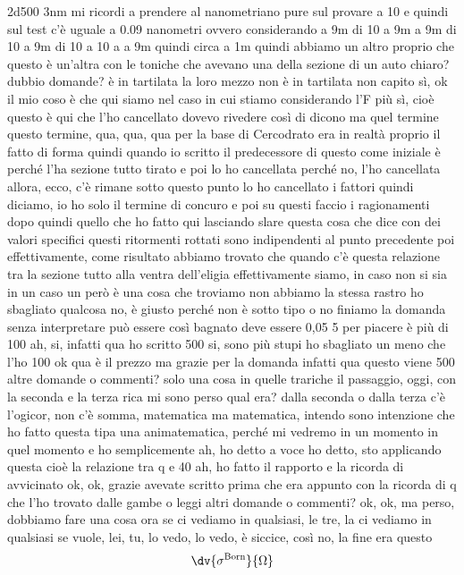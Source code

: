 \begin{soluzione}
   2d500 3nm mi ricordi a prendere al nanometriano pure sul provare a 10 e quindi sul test c'è uguale a 0.09 nanometri ovvero considerando a 9m di 10 a 9m a 9m di 10 a 9m di 10 a 10 a a 9m quindi circa a 1m quindi abbiamo un altro proprio che questo è un'altra con le toniche che avevano una della sezione di un auto chiaro? dubbio domande? è in tartilata la loro mezzo non è in tartilata non capito sì, ok il mio coso è che qui siamo nel caso in cui stiamo considerando l'F più sì, cioè questo è qui che l'ho cancellato dovevo rivedere così di dicono ma quel termine questo termine, qua, qua, qua per la base di Cercodrato era in realtà proprio il fatto di forma quindi quando io scritto il predecessore di questo come iniziale è perché l'ha sezione tutto tirato e poi lo ho cancellata perché no, l'ho cancellata allora, ecco, c'è rimane sotto questo punto lo ho cancellato i fattori quindi diciamo, io ho solo il termine di concuro e poi su questi faccio i ragionamenti dopo quindi quello che ho fatto qui lasciando slare questa cosa che dice con dei valori specifici questi ritormenti rottati sono indipendenti al punto precedente poi effettivamente, come risultato abbiamo trovato che quando c'è questa relazione tra la sezione tutto alla ventra dell'eligia effettivamente siamo, in caso non si sia in un caso un però è una cosa che troviamo non abbiamo la stessa rastro ho sbagliato qualcosa no, è giusto perché non è sotto tipo o no finiamo la domanda senza interpretare può essere così bagnato deve essere 0,05 5 per piacere è più di 100 ah, si, infatti qua ho scritto 500 si, sono più stupi ho sbagliato un meno che l'ho 100 ok qua è il prezzo ma grazie per la domanda infatti qua questo viene 500 altre domande o commenti? solo una cosa in quelle trariche il passaggio, oggi, con la seconda e la terza rica mi sono perso qual era? dalla seconda o dalla terza c'è l'ogicor, non c'è somma, matematica ma matematica, intendo sono intenzione che ho fatto questa tipa una animatematica, perché mi vedremo in un momento in quel momento e ho semplicemente ah, ho detto a voce ho detto, sto applicando questa cioè la relazione tra q e 40 ah, ho fatto il rapporto e la ricorda di avvicinato ok, ok, grazie avevate scritto prima che era appunto con la ricorda di q che l'ho trovato dalle gambe o leggi altri domande o commenti? ok, ok, ma perso, dobbiamo fare una cosa ora se ci vediamo in qualsiasi, le tre, la ci vediamo in qualsiasi se vuole, lei, tu, lo vedo, lo vedo, è siccice, così no, la fine era questo
   \begin{equation*}
      \dv{\sigma^{\rm Born}}{\Omega}

\end{equation*}
\end{soluzione}
